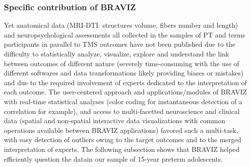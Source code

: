 \documentclass[twocolumn]{svjour3}
\begin{document}

\subsubsection{Specific contribution of BRAVIZ}

Yet anatomical data (MRI-DTI: structures volume, fibers number and length) and neuropsychological assessments all collected in the samples of PT and terms participants in parallel to TMS outcomes have not been published due to the difficulty to statistically analyze, visualize, explore and understand the link between outcomes of different nature (severely time-consuming with the use of different softwares and data transformations likely providing biases or mistakes) and due to the required involvement of experts dedicated to the interpretation of each outcome. The user-centered approach and applications/modules of BRAVIZ with real-time statistical analyses (color coding for instantaneous detection of a correlation for example), and access to multi-facetted neuroscience and clinical data (spatial and non-spatial interactive data visualizations with common operations available between BRAVIZ applications) favored such a multi-task, with easy detection of outliers owing to the target outcomes and to the merged interpretation of experts. The following subsection shows that BRAVIZ helped efficiently question the datain our sample of 15-year preterm adolescents.
\end{document}
